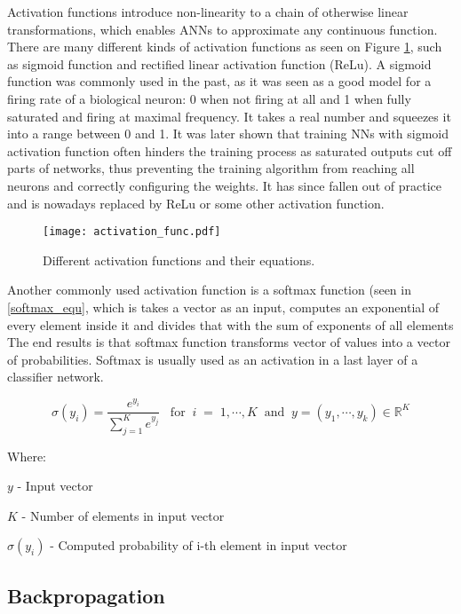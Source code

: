 Activation functions introduce non-linearity to a chain of otherwise linear transformations, which enables ANNs to approximate any continuous function\cite{geron}.
There are many different kinds of activation functions as seen on Figure \ref{activation_functions}, such as sigmoid function and rectified linear activation function (ReLu).
A sigmoid function was commonly used in the past, as it was seen as a good model for a firing rate of a biological neuron: 0 when not firing at all and 1 when fully saturated and firing at maximal frequency\cite{cs231n}.
It takes a real number and squeezes it into a range between 0 and 1.
It was later shown that training NNs with sigmoid activation function often hinders the training process as saturated outputs cut off parts of networks, thus preventing the training algorithm from reaching all neurons and correctly configuring the weights\cite{cs231n}.
It has since fallen out of practice and is nowadays replaced by ReLu or some other activation function.

\begin{figure}[ht!]
        \centering
        \texttt{[image: activation\_func.pdf]} 
        \caption{Different activation functions and their equations.}
        \label{activation_functions}
\end{figure}


Another commonly used activation function is a softmax function (seen in \ref{softmax_equ}, which is takes a vector as an input, computes an exponential of every element inside it and divides that with the sum of exponents of all elements\cite{geron}
The end results is that softmax function transforms vector of values into a vector of probabilities.
Softmax is usually used as an activation in a last layer of a classifier network. 

\begin{equation}\label{softmax_equ}
    \sigma(y_i) = \frac{e^{y_i}}{\sum_{j=1}^{K}e^{y_j}}\;\;\;\text{for}\;\;i\;=\;1,\cdots,K\;\;\text{and}\;\;y=(y_1,\cdots,y_k)\in\mathbb{R}^K
\end{equation}

Where:

$y$ - Input vector

$K$ - Number of elements in input vector

$\sigma(y_i)$ - Computed probability of i-th element in input vector 


\subsection{ Backpropagation}

